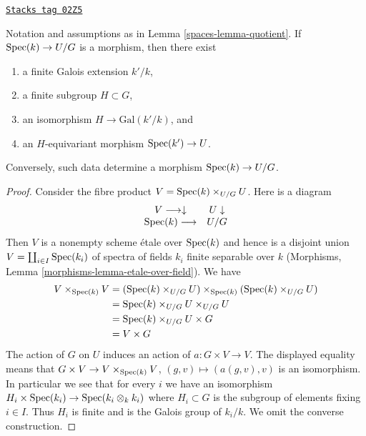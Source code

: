 \begin{lemma}
\label{spaces-lemma-quotient-field-map}
\href{https://stacks.math.columbia.edu/tag/02Z5}{\texttt{Stacks tag 02Z5}}

Notation and assumptions as in Lemma \ref{spaces-lemma-quotient}.
If $\operatorname{Spec}(k) \to U/G$ is a morphism, then there exist
\begin{enumerate}
\item a finite Galois extension $k'/k$,
\item a finite subgroup $H \subset G$,
\item an isomorphism $H \to \text{Gal}(k'/k)$, and
\item an $H$-equivariant morphism $\operatorname{Spec}(k') \to U$.
\end{enumerate}
Conversely, such data determine a morphism $\operatorname{Spec}(k) \to U/G$.
\end{lemma}

\begin{proof}
Consider the fibre product $V = \operatorname{Spec}(k) \times_{U/G} U$.
Here is a diagram
$$
\begin{array}{cc}V \longrightarrow\downarrow & U \downarrow \\ \operatorname{Spec}(k) \longrightarrow & U/G\end{array}
$$
Then $V$ is a nonempty scheme \'etale over $\operatorname{Spec}(k)$ and hence is a
disjoint union $V = \coprod_{i \in I} \operatorname{Spec}(k_i)$
of spectra of fields $k_i$ finite separable over $k$
(Morphisms, Lemma \ref{morphisms-lemma-etale-over-field}).
We have
\begin{align*}
V \times_{\operatorname{Spec}(k)} V
& =
(\operatorname{Spec}(k) \times_{U/G} U) \times_{\operatorname{Spec}(k)}(\operatorname{Spec}(k) \times_{U/G} U) \\
& =
\operatorname{Spec}(k) \times_{U/G} U \times_{U/G} U \\
& =
\operatorname{Spec}(k) \times_{U/G} U \times G \\
& =
V \times G
\end{align*}
The action of $G$ on $U$ induces an action of $a : G \times V \to V$.
The displayed equality means that
$G \times V \to V \times_{\operatorname{Spec}(k)} V$, $(g, v) \mapsto (a(g, v), v)$
is an isomorphism. In particular we see that for every $i$ we have
an isomorphism $H_i \times \operatorname{Spec}(k_i) \to \operatorname{Spec}(k_i \otimes_k k_i)$
where $H_i \subset G$ is the subgroup of elements fixing $i \in I$.
Thus $H_i$ is finite and is the Galois group of $k_i/k$.
We omit the converse construction.
\end{proof}

